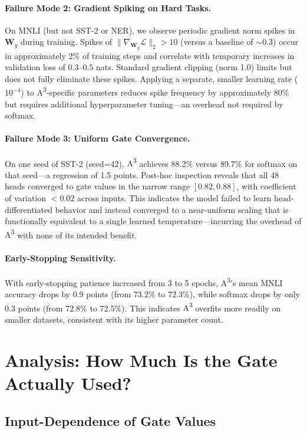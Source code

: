 \documentclass[11pt]{article}
\newcommand{\AAA}{\textsc{A\textsuperscript{3}}}
\newcommand{\bW}{\mathbf{W}}
\begin{document}
\paragraph{Failure Mode 2: Gradient Spiking on Hard Tasks.}
On MNLI (but not SST-2 or NER), we observe periodic gradient norm spikes in $\bW_g$ during training. Spikes of $\|\nabla_{\bW_g}\mathcal{L}\|_2 > 10$ (versus a baseline of $\sim 0.3$) occur in approximately 2\% of training steps and correlate with temporary increases in validation loss of $0.3$--$0.5$ nats. Standard gradient clipping (norm 1.0) limits but does not fully eliminate these spikes. Applying a separate, smaller learning rate ($10^{-4}$) to \AAA{}-specific parameters reduces spike frequency by approximately 80\% but requires additional hyperparameter tuning---an overhead not required by softmax.

\paragraph{Failure Mode 3: Uniform Gate Convergence.}
On one seed of SST-2 (seed=42), \AAA{} achieves 88.2\% versus 89.7\% for softmax on that seed---a regression of 1.5 points. Post-hoc inspection reveals that all 48 heads converged to gate values in the narrow range $[0.82, 0.88]$, with coefficient of variation $<0.02$ across inputs. This indicates the model failed to learn head-differentiated behavior and instead converged to a near-uniform scaling that is functionally equivalent to a single learned temperature---incurring the overhead of \AAA{} with none of its intended benefit.

\paragraph{Early-Stopping Sensitivity.}
With early-stopping patience increased from 3 to 5 epochs, \AAA{}'s mean MNLI accuracy drops by 0.9 points (from 73.2\% to 72.3\%), while softmax drops by only 0.3 points (from 72.8\% to 72.5\%). This indicates \AAA{} overfits more readily on smaller datasets, consistent with its higher parameter count.

\section{Analysis: How Much Is the Gate Actually Used?}
\label{sec:analysis}

\subsection{Input-Dependence of Gate Values}
\end{document}
